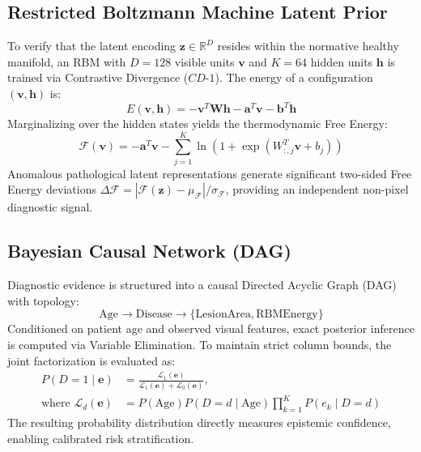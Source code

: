 \documentclass[conference]{IEEEtran}
\begin{document}
\subsection{Restricted Boltzmann Machine Latent Prior}
To verify that the latent encoding $\mathbf{z} \in \mathbb{R}^{D}$ resides within the normative healthy manifold, an RBM with $D=128$ visible units $\mathbf{v}$ and $K=64$ hidden units $\mathbf{h}$ is trained via Contrastive Divergence ($CD\text{-}1$). The energy of a configuration $(\mathbf{v}, \mathbf{h})$ is:
\begin{equation}
E(\mathbf{v}, \mathbf{h}) = -\mathbf{v}^T \mathbf{W} \mathbf{h} - \mathbf{a}^T \mathbf{v} - \mathbf{b}^T \mathbf{h}
\end{equation}
Marginalizing over the hidden states yields the thermodynamic Free Energy:
\begin{equation}
\mathcal{F}(\mathbf{v}) = -\mathbf{a}^T \mathbf{v} - \sum_{j=1}^{K} \ln\left(1 + \exp\left(W_{:, j}^T \mathbf{v} + b_j\right)\right)
\end{equation}
Anomalous pathological latent representations generate significant two-sided Free Energy deviations $\Delta \mathcal{F} = |\mathcal{F}(\mathbf{z}) - \mu_{\mathcal{F}}| / \sigma_{\mathcal{F}}$, providing an independent non-pixel diagnostic signal.

\subsection{Bayesian Causal Network (DAG)}
Diagnostic evidence is structured into a causal Directed Acyclic Graph (DAG) with topology:
\begin{equation}
\text{Age} \longrightarrow \text{Disease} \longrightarrow \{\text{LesionArea}, \text{RBMEnergy}\}
\end{equation}
Conditioned on patient age and observed visual features, exact posterior inference is computed via Variable Elimination. To maintain strict column bounds, the joint factorization is evaluated as:
\begin{equation}
\begin{split}
P(D=1 \mid \mathbf{e}) &= \frac{\mathcal{L}_1(\mathbf{e})}{\mathcal{L}_1(\mathbf{e}) + \mathcal{L}_0(\mathbf{e})}, \\
\text{where } \mathcal{L}_d(\mathbf{e}) &= P(\text{Age}) P(D=d \mid \text{Age}) \prod_{k=1}^K P(e_k \mid D=d)
\end{split}
\end{equation}
The resulting probability distribution directly measures epistemic confidence, enabling calibrated risk stratification.
\end{document}

